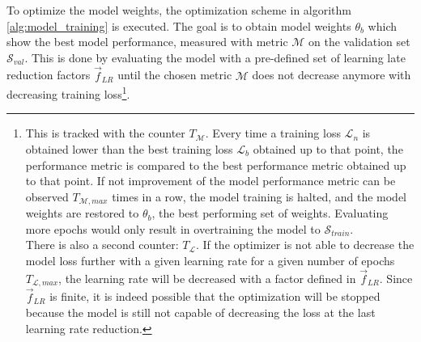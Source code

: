 To optimize the model weights, the optimization scheme in algorithm \ref{alg:model_training} is executed.
The goal is to obtain model weights $\theta_b$ which show the best model performance, measured with metric $\mathcal{M}$ on the validation set $\mathcal{S}_{val}$.
This is done by evaluating the model with a pre-defined set of learning late reduction factors $\vec{f}_{LR}$ until the chosen metric $\mathcal{M}$ does not decrease anymore with decreasing training loss\footnote{
    This is tracked with the counter $T_\mathcal{M}$. Every time a training loss $\mathcal{L}_n$ is obtained lower than the best training loss $\mathcal{L}_b$ obtained up to that point, 
    the performance metric is compared to the best performance metric obtained up to that point. 
    If not improvement of the model performance metric can be observed $T_{\mathcal{M}, max}$ times in a row, the model training is halted, and the model weights are restored to $\theta_b$, the best performing set of weights.
    Evaluating more epochs would only result in overtraining the model to $\mathcal{S}_{train}$.
    \\[5pt]
    There is also a second counter: $T_\mathcal{L}$. If the optimizer is not able to decrease the model loss further with a given learning rate for a given number of epochs $T_{\mathcal{L}, max}$, the learning rate will be decreased with a factor defined in $\vec{f}_{LR}$.
    Since $\vec{f}_{LR}$ is finite, it is indeed possible that the optimization will be stopped because the model is still not capable of decreasing the loss at the last learning rate reduction.
}.


